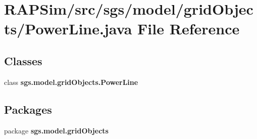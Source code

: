 \section{R\-A\-P\-Sim/src/sgs/model/grid\-Objects/\-Power\-Line.java File Reference}
\label{_power_line_8java}
\subsection*{Classes}
\begin{DoxyCompactItemize}
\item 
class {\bf sgs.\-model.\-grid\-Objects.\-Power\-Line}
\end{DoxyCompactItemize}
\subsection*{Packages}
\begin{DoxyCompactItemize}
\item 
package {\bf sgs.\-model.\-grid\-Objects}
\end{DoxyCompactItemize}
